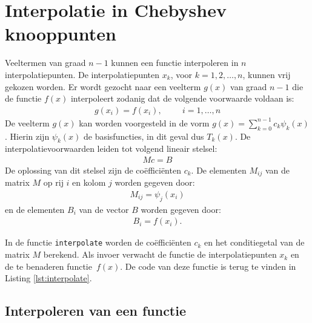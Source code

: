 \documentclass[a4paper, 12pt, titlepage, fleqn]{article}
\begin{document}
\section{Interpolatie in Chebyshev knooppunten}
\label{sec:interpolatie}
Veeltermen van graad $n-1$ kunnen een functie interpoleren in $n$ interpolatiepunten. De interpolatiepunten $x_k$, voor $k = 1,2,\ldots,n$, kunnen vrij gekozen worden. Er wordt gezocht naar een veelterm $g(x)$ van graad $n-1$ die de functie $f(x)$ interpoleert zodanig dat de volgende voorwaarde voldaan is:
\begin{align*}
g(x_i) = f(x_i), \hspace{1cm} i = 1,\ldots,n
\end{align*}
De veelterm $g(x)$ kan worden voorgesteld in de vorm $g(x) = \sum_{k=0}^{n-1}c_k\psi_k(x)$. Hierin zijn $\psi_k(x)$ de basisfuncties, in dit geval dus $T_k(x)$. De interpolatievoorwaarden leiden tot volgend lineair stelsel:
\begin{align*}
Mc = B
\end{align*}
De oplossing van dit stelsel zijn de co\"effici\"enten $c_k$. De elementen $M_{ij}$ van de matrix $M$ op rij $i$ en kolom $j$ worden gegeven door:
\begin{align*}
M_{ij} = \psi_j(x_i)
\end{align*}
en de elementen $B_i$ van de vector $B$ worden gegeven door:
\begin{align*}
B_i = f(x_i).
\end{align*}

In de functie \texttt{interpolate} worden de co\"effici\"enten $c_k$ en het conditiegetal van de matrix $M$ berekend. Als invoer verwacht de functie de interpolatiepunten $x_k$ en de te benaderen functie~$f(x)$. De code van deze functie is terug te vinden in Listing \ref{lst:interpolate}.



\subsection{Interpoleren van een functie}
\end{document}
